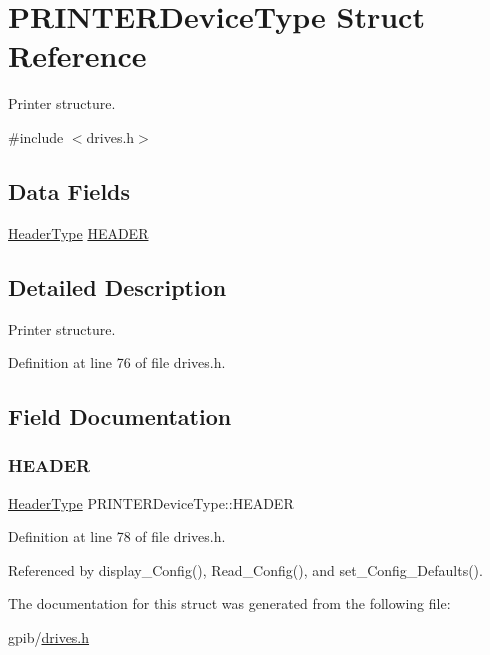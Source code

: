\hypertarget{structPRINTERDeviceType}{}\section{P\+R\+I\+N\+T\+E\+R\+Device\+Type Struct Reference}
\label{structPRINTERDeviceType}


Printer structure.  




{\ttfamily \#include $<$drives.\+h$>$}

\subsection*{Data Fields}
\begin{DoxyCompactItemize}
\item 
\hyperlink{structHeaderType}{Header\+Type} \hyperlink{structPRINTERDeviceType_ac1ae5b29520f726e4aaab0232ecd6463}{H\+E\+A\+D\+ER}
\end{DoxyCompactItemize}


\subsection{Detailed Description}
Printer structure. 

Definition at line 76 of file drives.\+h.



\subsection{Field Documentation}
\mbox{\label{structPRINTERDeviceType_ac1ae5b29520f726e4aaab0232ecd6463}} 
\subsubsection{\texorpdfstring{H\+E\+A\+D\+ER}{HEADER}}
{\footnotesize\ttfamily \hyperlink{structHeaderType}{Header\+Type} P\+R\+I\+N\+T\+E\+R\+Device\+Type\+::\+H\+E\+A\+D\+ER}



Definition at line 78 of file drives.\+h.



Referenced by display\+\_\+\+Config(), Read\+\_\+\+Config(), and set\+\_\+\+Config\+\_\+\+Defaults().



The documentation for this struct was generated from the following file\+:\begin{DoxyCompactItemize}
\item 
gpib/\hyperlink{drives_8h}{drives.\+h}\end{DoxyCompactItemize}
